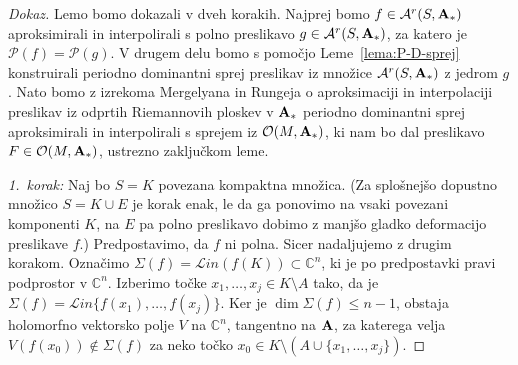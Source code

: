 \documentclass[12pt,a4paper,twoside]{article}
\theoremstyle{definition} %
\newenvironment{dokaz}[1][Dokaz]{\begin{proof}[#1]}{\end{proof}}
\theoremstyle{plain} %
\numberwithin{equation}{section}  %
\begin{document}
\begin{dokaz}
Lemo bomo dokazali v dveh korakih. Najprej bomo $f \in \mathcal{A}^{r}(S, \textbf{\textup{A}}_{*})$ aproksimirali in interpolirali s polno preslikavo $g \in \mathcal{A}^{r}(S, \textbf{\textup{A}}_{*})$, za katero je $\mathcal{P}(f) = \mathcal{P}(g)$.
V drugem delu bomo s pomočjo Leme~\ref{lema:P-D-sprej} konstruirali periodno dominantni sprej preslikav iz množice $\mathcal{A}^{r}(S, \textbf{\textup{A}}_{*})$ z jedrom $g$. Nato bomo z izrekoma Mergelyana in Rungeja o aproksimaciji in interpolaciji preslikav iz odprtih Riemannovih ploskev v $\textbf{\textup{A}}_{*}$ periodno dominantni sprej aproksimirali in interpolirali s sprejem iz $\mathcal{O}(M, \textbf{\textup{A}}_{*})$, ki nam bo dal preslikavo $F   \in \mathcal{O}(M, \textbf{\textup{A}}_{*})$, ustrezno zaključkom leme. \newline

\textit{1.~korak:} Naj bo $S = K$ povezana kompaktna množica. (Za splošnejšo dopustno množico $S = K \cup E$ je korak enak, le da ga ponovimo na vsaki povezani komponenti $K$, na $E$ pa polno preslikavo dobimo z manjšo gladko deformacijo preslikave $f$.)
Predpostavimo, da $f$ ni polna. Sicer nadaljujemo z drugim korakom.
Označimo $\Sigma(f) = \mathcal{L}in (f(K)) \subset \mathbb{C}^{n}$, ki je po predpostavki pravi podprostor v $\mathbb{C}^{n}$.
Izberimo točke $x_{1}, \dots , x_{j} \in K \setminus A$ tako, da je $\Sigma(f) = \mathcal{L}in \{ f(x_{1}), \dots , f(x_{j}) \}$.
Ker je $\dim \Sigma(f) \leq n-1$, obstaja holomorfno vektorsko polje $V$ na $\mathbb{C}^{n}$, tangentno na $\textbf{\textup{A}}$, za katerega velja $V(f(x_0)) \notin \Sigma(f)$ za neko točko $x_0 \in K \setminus (A \cup \{ x_{1}, \dots , x_{j} \})$.


\end{dokaz}
\end{document}
